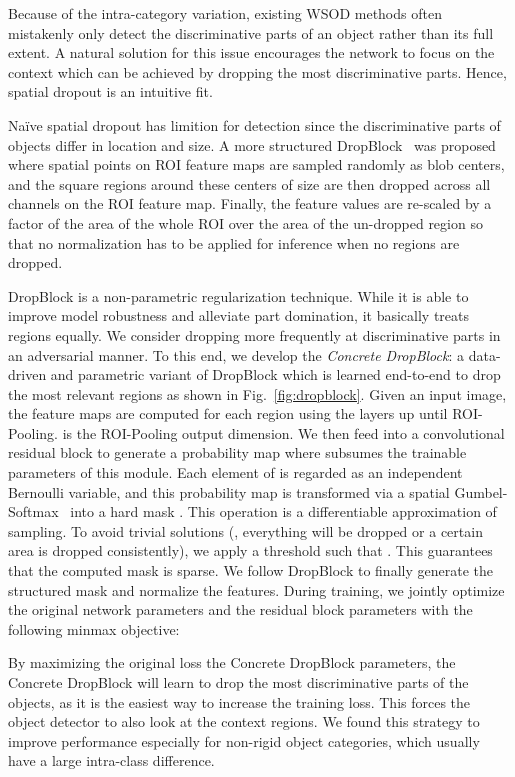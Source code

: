 \documentclass[10pt,twocolumn,letterpaper]{article}
\begin{document}
Because of the intra-category variation, existing WSOD methods often mistakenly only detect the discriminative parts of an object rather than its full extent. A natural solution for this issue encourages the network to focus on the context which can be achieved by dropping the most discriminative parts. Hence, spatial dropout is an intuitive fit. 

Na\"ive spatial dropout has limition for detection since the discriminative parts of objects differ in location and size. A more structured DropBlock~\cite{dropblock} was proposed where spatial points on ROI feature maps are sampled randomly as blob centers, and the square regions around these centers of size  are then dropped across all channels on the ROI feature map. Finally, the feature values are re-scaled by a factor of the area of the whole ROI over the area of the un-dropped region so that no normalization has to be applied for inference when no regions are dropped. 

DropBlock is a non-parametric regularization technique. While it is able to improve model robustness and alleviate part domination, it basically treats regions equally. We consider dropping more frequently at discriminative parts in an adversarial manner. To this end, we develop the \textit{Concrete DropBlock}: a data-driven and parametric variant of DropBlock which is learned end-to-end to drop the most relevant regions as shown in Fig.~\ref{fig:dropblock}. Given an input image, the feature maps  are computed for each region  using the layers up until ROI-Pooling.  is the ROI-Pooling output dimension. We then feed  into a convolutional residual block to generate a probability map  where  subsumes the trainable parameters of this module. Each element of  is regarded as an independent Bernoulli variable, and this probability map is transformed via a spatial Gumbel-Softmax~\cite{Gumbel-Softmax,concrete} into a hard mask . This operation is a differentiable approximation of  sampling. To avoid trivial solutions (\eg, everything will be dropped or a certain area is dropped consistently), we apply a threshold  such that . This  guarantees that the computed mask  is sparse. We follow DropBlock to finally generate the structured mask and normalize the features. During training, we jointly optimize the original network parameters  and the residual block parameters  with the following minmax objective:

By maximizing the original loss \wrt the Concrete DropBlock parameters, the Concrete DropBlock will learn to drop the most discriminative parts of the objects, as it is  the easiest way to increase the training loss. This forces the object detector  to also look at the context regions. We found this strategy to improve performance especially for  non-rigid object categories, which usually have a large intra-class difference.
\end{document}
